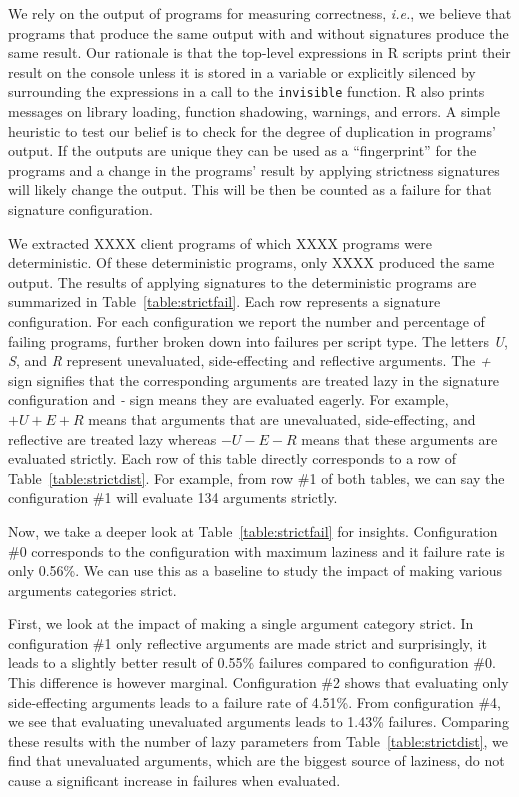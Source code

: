 \documentclass[review,nonacm,screen,acmsmall,anonymous=true]{acmart}
\newcommand{\code}[1]{\lstinline |#1|\xspace}
\newcommand{\config}[1]{configuration \#{#1}}
\newcommand{\cconfig}[1]{Configuration \#{#1}}
\begin{document}
We rely on the output of programs for measuring correctness, \emph{i.e.}, we
believe that programs that produce the same output with and without signatures
produce the same result. Our rationale is that the top-level expressions in R
scripts print their result on the console unless it is stored in a variable or
explicitly silenced by surrounding the expressions in a call to the
\code{invisible} function. R also prints messages on library loading, function
shadowing, warnings, and errors. A simple heuristic to test our belief is to
check for the degree of duplication in programs' output. If the outputs are
unique they can be used as a ``fingerprint'' for the programs and a change in
the programs' result by applying strictness signatures will likely change the
output. This will be then be counted as a failure for that signature
configuration.

We extracted XXXX client programs of which XXXX programs were deterministic. Of
these deterministic programs, only XXXX produced the same output. The results of
applying signatures to the deterministic programs are summarized in
Table~\ref{table:strictfail}. Each row represents a signature configuration. For
each configuration we report the number and percentage of failing programs,
further broken down into failures per script type. The letters \emph{U},
\emph{S}, and \emph{R} represent unevaluated, side-effecting and reflective
arguments. The \emph{+} sign signifies that the corresponding arguments are
treated lazy in the signature configuration and \emph{-} sign means they are
evaluated eagerly. For example, $+U+E+R$ means that arguments that are
unevaluated, side-effecting, and reflective are treated lazy whereas $-U-E-R$
means that these arguments are evaluated strictly. Each row of this table
directly corresponds to a row of Table~\ref{table:strictdist}. For example,
from row \#1 of both tables, we can say the \config{1} will evaluate 134
arguments strictly.

Now, we take a deeper look at Table~\ref{table:strictfail} for insights.
\cconfig{0} corresponds to the configuration with maximum laziness and it failure rate
is only 0.56\%. We can use this as a baseline to study the impact of making
various arguments categories strict.

First, we look at the impact of making a single argument category strict. In
\config{1} only reflective arguments are made strict and surprisingly, it leads
to a slightly better result of 0.55\% failures compared to \config{0}. This
difference is however marginal. \cconfig{2} shows that evaluating only
side-effecting arguments leads to a failure rate of 4.51\%. From \config{4},
we see that evaluating unevaluated arguments leads to 1.43\% failures. Comparing
these results with the number of lazy parameters from
Table~\ref{table:strictdist}, we find that unevaluated arguments, which are the
biggest source of laziness, do not cause a significant increase in failures when
evaluated.
\end{document}
